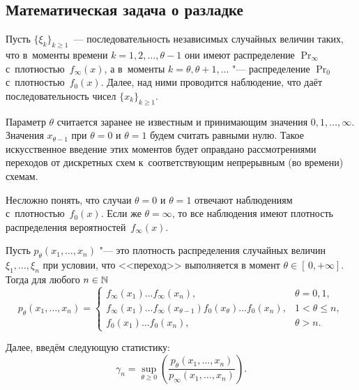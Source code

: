 \subsection{Математическая задача о разладке}

Пусть \(\{\xi_{k}\}_{k \geq 1}\)~--- последовательность независимых случайных величин таких, что в~моменты времени \(k = 1, 2, \ldots, \theta - 1\) они имеют распределение \(\Pr_{\infty}\) с~плотностью~\(f_{\infty}(x)\), а в~моменты \(k = \theta, \theta + 1, \ldots\) "--- распределение \(\Pr_{0}\) с~плотностью~\(f_{0}(x)\). 
Далее, над ними проводится наблюдение, что даёт последовательность чисел \(\{x_{k}\}_{k \geq 1}\). 

Параметр \(\theta\) считается заранее не известным и принимающим значения \(0, 1, \ldots, \infty\). 
Значения \(x_{\theta - 1}\) при \(\theta = 0\) и \(\theta = 1\) будем считать равными нулю. 
Такое искусственное введение этих моментов будет оправдано рассмотрениями переходов от дискретных схем к~соответствующим непрерывным (во времени) схемам.

Несложно понять, что случаи \(\theta = 0\) и \(\theta = 1\) отвечают наблюдениям с~плотностью~\(f_{0}(x)\). 
Если же \(\theta = \infty\), то все наблюдения имеют плотность распределения вероятностей~\(f_{\infty}(x)\).

Пусть \(p_{\theta}(x_{1}, \ldots, x_{n})\) "--- это плотность распределения случайных величин \(\xi_{1}, \ldots, \xi_{n}\) при условии, что <<переход>> выполняется в момент \(\theta \in [\,0, +\infty]\). 
Тогда для любого \(n \in \mathbb{N}\)
\begin{equation}\label{eq:anomaly-detection-density}
	p_{\theta}(x_{1}, \ldots, x_{n})
	=
	\begin{cases}
		f_{\infty}(x_{1}) \ldots f_{\infty}(x_{n}),& \theta = 0, 1, \\
		f_{\infty}(x_{1}) \ldots f_{\infty}(x_{\theta - 1}) f_{0}(x_{\theta}) \ldots f_{0}(x_{n}),& 1 < \theta \leq n, \\
		f_{0}(x_{1}) \ldots f_{0}(x_{n}),& \theta > n.
	\end{cases}
\end{equation}

Далее, введём следующую статистику:
\[
	\gamma_{n} 
	= \sup_{\theta \geq 0} \left(\frac{p_{\theta}(x_{1}, \ldots, x_{n})}{p_{\infty}(x_{1}, \ldots, x_{n})}\right).
\]

